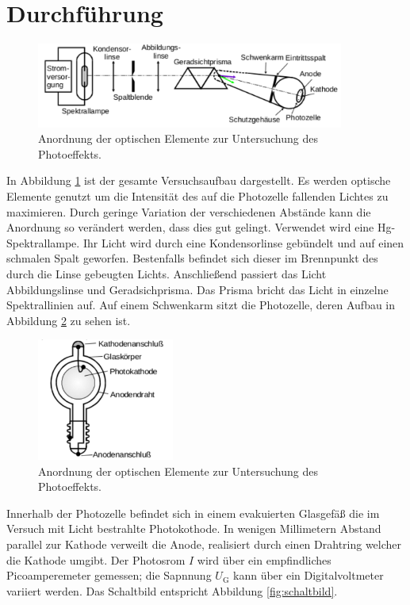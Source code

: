 \section{Durchf\"uhrung}
\label{sec:Durchfuehrung}

\begin{figure}
	\centering
	\includegraphics[width=0.9\textwidth]{Bilder/Aufbau.pdf}
	\caption{Anordnung der optischen Elemente zur Untersuchung des Photoeffekts.}
	\label{fig:Aufbau}
\end{figure}

In Abbildung \ref{fig:Aufbau} ist der gesamte Versuchsaufbau dargestellt. 
Es werden optische Elemente genutzt um die Intensität des auf die Photozelle fallenden Lichtes zu maximieren. 
Durch geringe Variation der verschiedenen Abstände kann die Anordnung so verändert werden, dass dies gut gelingt. 
Verwendet wird eine Hg-Spektrallampe.
Ihr Licht wird durch eine Kondensorlinse gebündelt und auf einen schmalen Spalt geworfen. 
Bestenfalls befindet sich dieser im Brennpunkt des durch die Linse gebeugten Lichts.
Anschließend passiert das Licht Abbildungslinse und Geradsichprisma. 
Das Prisma bricht das Licht in einzelne Spektrallinien auf. 
Auf einem Schwenkarm sitzt die Photozelle, deren Aufbau in Abbildung \ref{fig:Photozelle} zu sehen ist. 
\begin{figure}
	\centering
	\includegraphics[width=0.4\textwidth]{Bilder/Schema_Photozelle.pdf}
	\caption{Anordnung der optischen Elemente zur Untersuchung des Photoeffekts.}
	\label{fig:Photozelle}
\end{figure}
Innerhalb der Photozelle befindet sich in einem evakuierten Glasgefäß die im Versuch mit Licht bestrahlte Photokothode. 
In wenigen Millimetern Abstand parallel zur Kathode verweilt die Anode, realisiert durch einen Drahtring welcher die Kathode umgibt. 
Der Photosrom $I$ wird über ein empfindliches Picoamperemeter gemessen; die Sapnnung $U_\mathup{G}$ kann über ein Digitalvoltmeter variiert werden. 
Das Schaltbild entspricht Abbildung \ref{fig:schaltbild}. 

